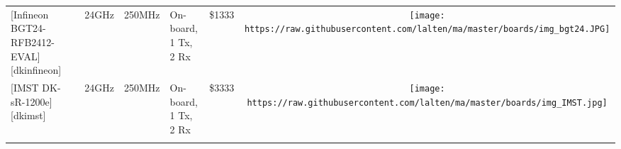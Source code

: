 \begin{longtable}[]{@{}llllllc@{}}
\begin{minipage}[t]{0.09\columnwidth}\raggedright\strut
{[}Infineon BGT24-RFB2412-EVAL{]}{[}dkinfineon{]}\strut
\end{minipage} & \begin{minipage}[t]{0.13\columnwidth}\raggedright\strut
\strut
\end{minipage} & \begin{minipage}[t]{0.09\columnwidth}\raggedright\strut
24GHz\strut
\end{minipage} & \begin{minipage}[t]{0.11\columnwidth}\raggedright\strut
250MHz\strut
\end{minipage} & \begin{minipage}[t]{0.10\columnwidth}\raggedright\strut
On-board, 1 Tx, 2 Rx\strut
\end{minipage} & \begin{minipage}[t]{0.15\columnwidth}\raggedright\strut
\$1333\strut
\end{minipage} & \begin{minipage}[t]{0.10\columnwidth}\centering\strut
\texttt{[image: https://raw.githubusercontent.com/lalten/ma/master/boards/img\_bgt24.JPG]}\strut
\end{minipage}\tabularnewline
\begin{minipage}[t]{0.09\columnwidth}\raggedright\strut
{[}IMST DK-sR-1200e{]}{[}dkimst{]}\strut
\end{minipage} & \begin{minipage}[t]{0.13\columnwidth}\raggedright\strut
\strut
\end{minipage} & \begin{minipage}[t]{0.09\columnwidth}\raggedright\strut
24GHz\strut
\end{minipage} & \begin{minipage}[t]{0.11\columnwidth}\raggedright\strut
250MHz\strut
\end{minipage} & \begin{minipage}[t]{0.10\columnwidth}\raggedright\strut
On-board, 1 Tx, 2 Rx\strut
\end{minipage} & \begin{minipage}[t]{0.15\columnwidth}\raggedright\strut
\$3333\strut
\end{minipage} & \begin{minipage}[t]{0.10\columnwidth}\centering\strut
\texttt{[image: https://raw.githubusercontent.com/lalten/ma/master/boards/img\_IMST.jpg]}\strut
\end{minipage}\tabularnewline
\begin{minipage}[t]{0.09\columnwidth}\raggedright\strut

\end{minipage}
\end{longtable}

